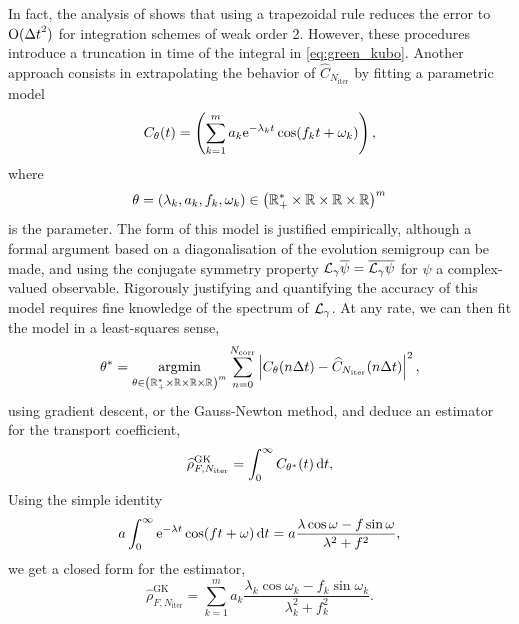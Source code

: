 In fact, the analysis of \cite[Corollary 2.3]{LMS13} shows that using a trapezoidal rule reduces the error to $\mathrm{O}({\Delta t}^2)$ for integration schemes of weak order 2.
However, these procedures introduce a truncation in time of the integral in \eqref{eq:green_kubo}.
Another approach consists in extrapolating the behavior of $\widehat{C}_{N_{\mathrm{iter}}}$ by fitting a parametric model 
\begin{equation}
    \label{eq:time_correlation_parametric_model}
    C_{\theta}(t)=\left(\sum_{k=1}^{m}a_k\mathrm{e}^{-\lambda_k t}\cos(f_k t+\omega_k)\right),
\end{equation}
where \[\theta=(\lambda_k,a_k,f_k,\omega_k)\in \left(\mathbb{R}_+^*\times\mathbb{R}\times \mathbb{R} \times \mathbb{R}\right)^{m}\]
is the parameter. The form of this model is justified empirically, although a formal argument based on a diagonalisation of the evolution semigroup can be made, and using the conjugate symmetry property
$\mathcal{L}_\gamma \overline{\psi}=\overline{\mathcal{L}_\gamma \psi}$
for $\psi$ a complex-valued observable.
Rigorously justifying and quantifying the accuracy of this model requires fine knowledge of the spectrum of $\mathcal{L}_\gamma$.
At any rate, we can then fit the model in a least-squares sense,
\begin{equation}
    \theta^*=\underset{\theta\in \left(\mathbb{R}_{+}^*\times\mathbb{R}\times \mathbb{R} \times \mathbb{R}\right)^{m}}{\mathrm{argmin}}\sum_{n=0}^{N_{\mathrm{corr}}}\left| C_{\theta}(n{\Delta t})-\widehat{C}_{N_{\mathrm{iter}}}(n{\Delta t}) \right|^2,
\end{equation}
using gradient descent, or the Gauss-Newton method, and deduce an estimator for the transport coefficient,
\begin{equation}
    \label{eq:rho_F_estimator_GK_fit}
    \widehat{\rho}^{\mathrm{GK}}_{F,N_{\mathrm{iter}}}=\int_0^\infty C_{\theta^*}(t)\,\mathrm{d} t,
\end{equation}
Using the simple identity
\begin{equation}
    \label{eq:int_analytic_form}
    a\int_0^{\infty}\mathrm{e}^{-\lambda t}\cos(ft+\omega)\,\mathrm{d} t=a\frac{\lambda\cos \omega - f\sin\omega}{\lambda^2+f^2},
\end{equation}
we get a closed form for the estimator,
\[\widehat{\rho}^{\mathrm{GK}}_{F,N_{\mathrm{iter}}}=\sum_{k=1}^m a_k\frac{\lambda_k\cos \omega_k - f_k\sin\omega_k}{\lambda_k^2+f_k^2}.\]
